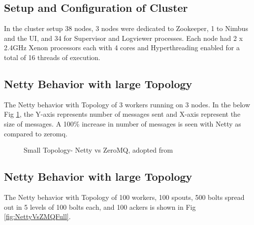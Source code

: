 \documentclass[9pt,twocolumn,twoside]{styles/osajnl}
\begin{document}
\subsection{Setup and Configuration of Cluster}
In the cluster setup 38 nodes, 3 nodes were dedicated to Zookeeper, 1
to Nimbus and the UI, and 34 for Supervisor and Logviewer processes.
Each node had 2 x 2.4GHz Xenon processors each with 4 cores and
Hyperthreading enabled for a total of 16 threads of execution.

\subsection{Netty Behavior with large Topology}
The Netty behavior with Topology of 3 workers running on 3 nodes. In
the below Fig \ref{fig:nettyvzmq-small}, the Y-axis represents number
of messages sent and X-axis represent the size of messages. A 100\%
increase in number of messages is seen with Netty as compared to
zeromq.

\begin{figure}[htbp]
	\centering
	\caption{Small Topology- Netty vs ZeroMQ, adopted from
          \cite{article-storm-netty} }
	\label{fig:nettyvzmq-small}
\end{figure}



\subsection{Netty Behavior with large Topology}
The Netty behavior with Topology of 100 workers, 100 spouts, 500 bolts
spread out in 5 levels of 100 bolts each, and 100 ackers is shown in
Fig \ref{fig:NettyVsZMQFull}.
\end{document}
